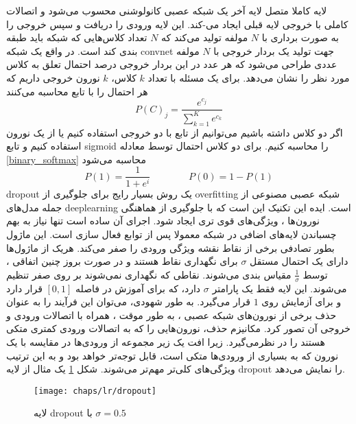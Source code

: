 لایه کاملا متصل لایه آخر یک شبکه عصبی کانولوشنی محسوب می‌شود و اتصالات کاملی با خروجی لایه قبلی ایجاد می-کند. این لایه ورودی را دریافت و سپس خروجی را به صورت برداری با $N$ مولفه تولید می‌کند که $N$ تعداد کلاس‌هایی که شبکه باید طبقه بندی کند است. در واقع یک شبکه  \gls{convnet} جهت تولید یک بردار خروجی با $N$ مولفه عددی طراحی می‌شود که هر عدد در این بردار خروجی درصد احتمال تعلق به کلاس مورد نظر را نشان می‌دهد. برای یک مسئله با تعداد $k$  کلاس، $k$ نورون خروجی داریم که هر احتمال را با تابع  محاسبه می‌کنند
\begin{equation}
	P(C)_j = \frac{e^{c_j}}{\sum^{K}_{k=1}e^{c_k}}
	\label{eq:ch_lr:softmax}
\end{equation}
اگر دو کلاس داشته باشیم می‌توانیم از تابع  با دو خروجی استفاده کنیم یا از یک نورون استفاده کنیم و تابع \gls{sigmoid} را محاسبه کنیم. برای دو کلاس احتمال توسط معادله \ref{binary_softmax} محاسبه می‌شود
\begin{equation}
	P(1) = \frac{1}{1+e^i} \qquad \qquad P(0) = 1-P(1)
	\label{eq:ch_lr:binary_softmax}
\end{equation}
\gls{dropout} یک روش بسیار رایج برای جلوگیری از \gls{overfitting} شبکه عصبی مصنوعی از جمله مدل‌های \gls{deeplearning} است\cite{srivastava2014dropout}.
ایده این تکنیک این است که با جلوگیری از هماهنگی نورون‌ها ، ویژگی‌های قوی تری ایجاد شود. اجرای آن ساده است تنها نیاز به بهم چسباندن لایه‌های اضافی در شبکه معمولا پس از توابع فعال سازی است. این ماژول بطور تصادفی برخی از نقاط نقشه ویژگی ورودی را  صفر می‌کند. هریک از ماژول‌ها دارای یک احتمال مستقل $\sigma$ برای نگهداری نقاط هستند و در صورت بروز چنین اتفاقی ، توسط  $\frac{1}{\sigma}$ مقیاس بندی می‌شوند. نقاطی که نگهداری نمی‌شوند بر روی صفر تنظیم می‌شوند. این لایه فقط یک پارامتر $\sigma$ دارد، که برای آموزش در فاصله $[0,1]$ قرار دارد و برای آزمایش روی $1$ قرار می‌گیرد. به طور شهودی، می‌توان این فرآیند را به عنوان حذف برخی از نورون‌های شبکه عصبی ، به طور موقت ، همراه با اتصالات ورودی و خروجی آن تصور کرد. مکانیزم حذف، نورون‌هایی را که به اتصالات ورودی کمتری متکی هستند را در نظرمی‌گیرد. زیرا افت یک زیر مجموعه از ورودی‌ها در مقایسه با یک نورون که به بسیاری از ورودی‌ها متکی است، قابل توجه‌تر خواهد بود و به این ترتیب ویژگی‌های کلی‌تر مهم‌تر می‌شوند. شکل \ref{fig:ch_lr:dropout} یک مثال از لایه \gls{dropout} را نمایش می‌دهد.
\begin{figure}[!ht]
	\centerline{\texttt{[image: chaps/lr/dropout]}}
	\caption{
	لایه \gls{dropout} با $\sigma=0.5$
	}
	\label{fig:ch_lr:dropout}
\end{figure}

